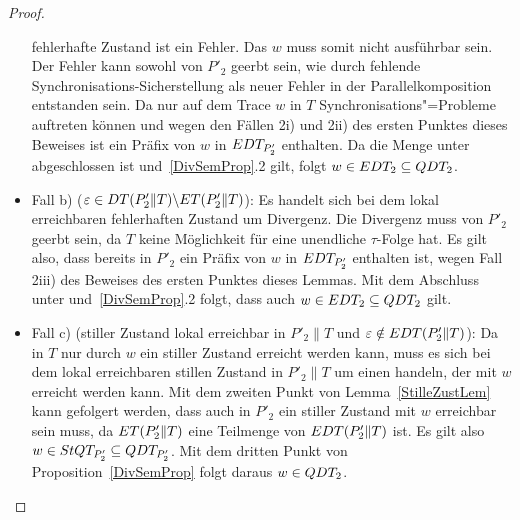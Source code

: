 \begin{proof}
\begin{itemize}
      fehlerhafte Zustand ist ein Fehler. Das $w$ muss somit nicht ausführbar
      sein. Der Fehler kann sowohl von $P'_2$ geerbt sein, wie durch fehlende
      Synchronisations-Sicherstellung als neuer Fehler in der
      Parallelkomposition entstanden sein. Da nur auf dem Trace $w$ in $T$
      Synchronisations"=Probleme auftreten können und wegen den Fällen 2i) und
      2ii) des ersten Punktes dieses Beweises ist ein Präfix von $w$ in $EDT
      _{P'_2}$ enthalten. Da die Menge \EDT{} unter \cont{} abgeschlossen ist
      und~\ref{DivSemProp}.2 gilt, folgt $w\in EDT _2\subseteq QDT _2$.
    \item Fall b) ($\varepsilon \in DT (P'_2\|T)\backslash ET(P'_2\|T)$): Es
      handelt sich bei dem lokal erreichbaren fehlerhaften Zustand um
      Divergenz. Die Divergenz muss von $P'_2$ geerbt sein, da $T$ keine
      Möglichkeit für eine unendliche $\tau$-Folge hat. Es gilt also, dass
      bereits in $P'_2$ ein Präfix von $w$ in $EDT _{P'_2}$ enthalten ist,
      wegen Fall 2iii) des Beweises des ersten Punktes dieses Lemmas. Mit dem
      Abschluss unter \cont{} und~\ref{DivSemProp}.2 folgt, dass auch $w\in
      EDT _2\subseteq QDT _2$ gilt.
    \item Fall c) (stiller Zustand lokal erreichbar in $P'_2\|T$ und $\varepsilon
      \notin EDT (P'_2\|T)$): Da in $T$ nur durch $w$ ein stiller Zustand
      erreicht werden kann, muss es sich bei dem lokal erreichbaren
      stillen Zustand in $P'_2\|T$ um einen handeln, der mit $w$ erreicht werden
      kann. Mit dem zweiten Punkt von Lemma~\ref{StilleZustLem} kann gefolgert
      werden, dass auch in $P'_2$ ein stiller Zustand mit $w$ erreichbar sein
      muss, da $ET (P'_2\|T)$ eine Teilmenge von $EDT (P'_2\|T)$ ist. Es gilt
      also $w\in StQT _{P'_2}\subseteq QDT _{P'_2}$. Mit dem dritten Punkt von
      Proposition~\ref{DivSemProp} folgt daraus $w\in QDT _2$.
  \end{itemize}


\end{proof}

